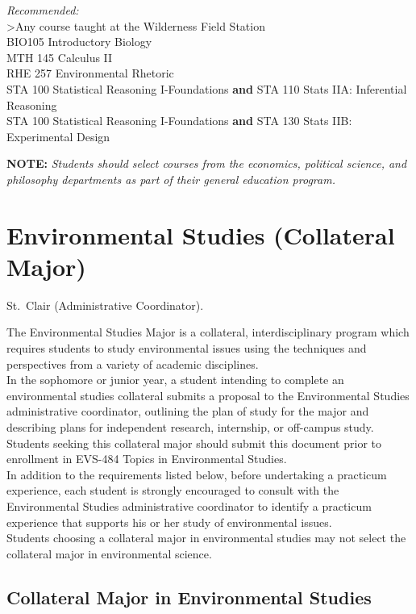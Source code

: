 \documentclass[
  letterpaper,
]{scrbook}
\begin{document}
\emph{Recommended:}\\
\textgreater Any course taught at the Wilderness Field Station\\
BIO105 Introductory Biology\\
MTH 145 Calculus II\\
RHE 257 Environmental Rhetoric\\
STA 100 Statistical Reasoning I-Foundations \textbf{and} STA 110 Stats
IIA: Inferential Reasoning\\
STA 100 Statistical Reasoning I-Foundations \textbf{and} STA 130 Stats
IIB: Experimental Design

\textbf{NOTE:} \emph{Students should select courses from the economics,
political science, and philosophy departments as part of their general
education program.}

\section{Environmental Studies (Collateral
Major)}\label{sec-environmental-studies}

St.~Clair (Administrative Coordinator).

The Environmental Studies Major is a collateral, interdisciplinary
program which requires students to study environmental issues using the
techniques and perspectives from a variety of academic disciplines.\\
In the sophomore or junior year, a student intending to complete an
environmental studies collateral submits a proposal to the Environmental
Studies administrative coordinator, outlining the plan of study for the
major and describing plans for independent research, internship, or
off-campus study. Students seeking this collateral major should submit
this document prior to enrollment in EVS-484 Topics in Environmental
Studies.\\
In addition to the requirements listed below, before undertaking a
practicum experience, each student is strongly encouraged to consult
with the Environmental Studies administrative coordinator to identify a
practicum experience that supports his or her study of environmental
issues.\\
Students choosing a collateral major in environmental studies may not
select the collateral major in environmental science.

\subsection{Collateral Major in Environmental
Studies}\label{collateral-major-in-environmental-studies}
\end{document}
